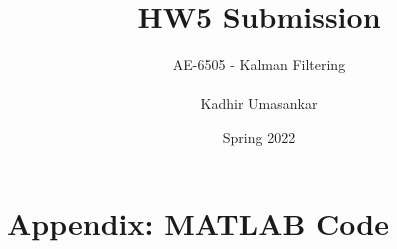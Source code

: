 \documentclass[12pt]{report}
\author{AE-6505 - Kalman Filtering \\\\ Kadhir Umasankar}
\title{HW5 Submission}
\date{Spring 2022}
\newlength{\originalVOffset}
\newlength{\originalHOffset}
\theoremstyle{definition}
\begin{document}
\maketitle

\setlength{\voffset}{-0.1cm}
\setlength{\hoffset}{-0.1cm}

\setlength{\voffset}{\originalVOffset}
\setlength{\hoffset}{\originalHOffset}

\section{Appendix: MATLAB Code}
\inputminted[linenos=true, breaklines=true, breakanywhere=true, fontsize=\scriptsize]{MATLAB}{../hw5.m}
\end{document}
